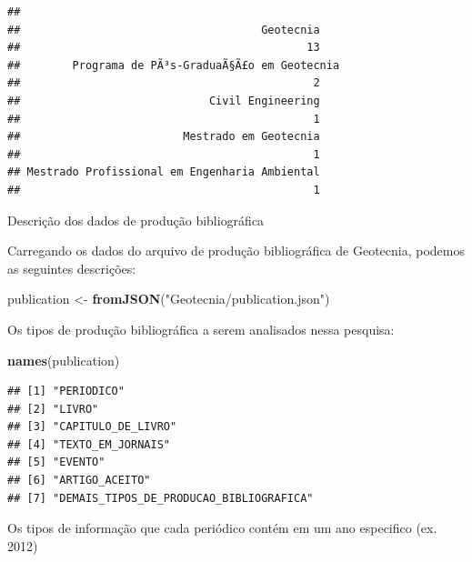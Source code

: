 \documentclass[]{article}
\newenvironment{Shaded}{\begin{snugshade}}{\end{snugshade}}
\newcommand{\DataTypeTok}[1]{\textcolor[rgb]{0.13,0.29,0.53}{#1}}
\newcommand{\KeywordTok}[1]{\textcolor[rgb]{0.13,0.29,0.53}{\textbf{#1}}}
\newcommand{\NormalTok}[1]{#1}
\newcommand{\OperatorTok}[1]{\textcolor[rgb]{0.81,0.36,0.00}{\textbf{#1}}}
\newcommand{\StringTok}[1]{\textcolor[rgb]{0.31,0.60,0.02}{#1}}
\begin{document}
\begin{verbatim}
## 
##                                     Geotecnia 
##                                            13 
##        Programa de PÃ³s-GraduaÃ§Ã£o em Geotecnia 
##                                             2 
##                             Civil Engineering 
##                                             1 
##                         Mestrado em Geotecnia 
##                                             1 
## Mestrado Profissional em Engenharia Ambiental 
##                                             1
\end{verbatim}

Descrição dos dados de produção bibliográfica

Carregando os dados do arquivo de produção bibliográfica de Geotecnia,
podemos as seguintes descrições:

\begin{Shaded}
\begin{Highlighting}[]
\NormalTok{publication <-}\StringTok{ }\KeywordTok{fromJSON}\NormalTok{(}\StringTok{"Geotecnia/publication.json"}\NormalTok{)}
\end{Highlighting}
\end{Shaded}

Os tipos de produção bibliográfica a serem analisados nessa pesquisa:

\begin{Shaded}
\begin{Highlighting}[]
\KeywordTok{names}\NormalTok{(publication)}
\end{Highlighting}
\end{Shaded}

\begin{verbatim}
## [1] "PERIODICO"                             
## [2] "LIVRO"                                 
## [3] "CAPITULO_DE_LIVRO"                     
## [4] "TEXTO_EM_JORNAIS"                      
## [5] "EVENTO"                                
## [6] "ARTIGO_ACEITO"                         
## [7] "DEMAIS_TIPOS_DE_PRODUCAO_BIBLIOGRAFICA"
\end{verbatim}

Os tipos de informação que cada periódico contém em um ano especifico
(ex. 2012)

\begin{Shaded}
\end{Shaded}
\end{document}
